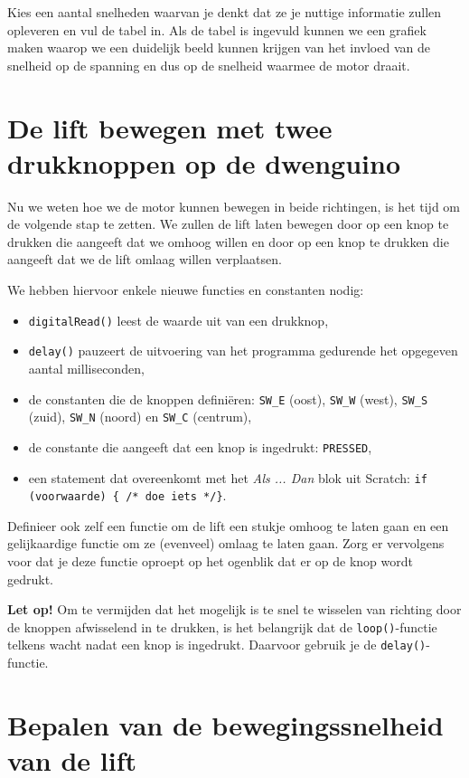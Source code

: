 \documentclass[a4paper, 10pt]{article}
\begin{document}
Kies een aantal snelheden waarvan je denkt dat ze je nuttige informatie zullen opleveren en vul de tabel in. Als de tabel
is ingevuld kunnen we een grafiek maken waarop we een duidelijk beeld kunnen krijgen van het invloed van de snelheid op
de spanning en dus op de snelheid waarmee de motor draait.

\section{De lift bewegen met twee drukknoppen op de dwenguino}

Nu we weten hoe we de motor kunnen bewegen in beide richtingen, is het tijd om de volgende stap te zetten. We zullen
de lift laten bewegen door op een knop te drukken die aangeeft dat we omhoog willen en door op een knop te drukken
die aangeeft dat we de lift omlaag willen verplaatsen.

We hebben hiervoor enkele nieuwe functies en constanten nodig:

\begin{itemize}
\item \texttt{digitalRead()} leest de waarde uit van een drukknop,
\item \texttt{delay()} pauzeert de uitvoering van het programma gedurende het opgegeven aantal milliseconden,
\item de constanten die de knoppen defini\"eren: \texttt{SW\_E} (oost), \texttt{SW\_W} (west), \texttt{SW\_S} (zuid), \texttt{SW\_N} (noord) en \texttt{SW\_C} (centrum),
\item de constante die aangeeft dat een knop is ingedrukt: \texttt{PRESSED},
\item een statement dat overeenkomt met het {\em Als ... Dan} blok uit Scratch: \texttt{if (voorwaarde) \{ /* doe iets */\}}.
\end{itemize}

Definieer ook zelf een functie om de lift een stukje omhoog te laten gaan en een gelijkaardige functie om ze (evenveel)
omlaag te laten gaan. Zorg er vervolgens voor dat je deze functie oproept op het ogenblik dat er op de knop wordt
gedrukt.

\textbf{Let op!} Om te vermijden dat het mogelijk is te snel te wisselen van richting door de knoppen afwisselend in te
drukken, is het belangrijk dat de \texttt{loop()}-functie telkens wacht nadat een knop is ingedrukt. Daarvoor gebruik je
de \texttt{delay()}-functie.

\section{Bepalen van de bewegingssnelheid van de lift}
\end{document}
